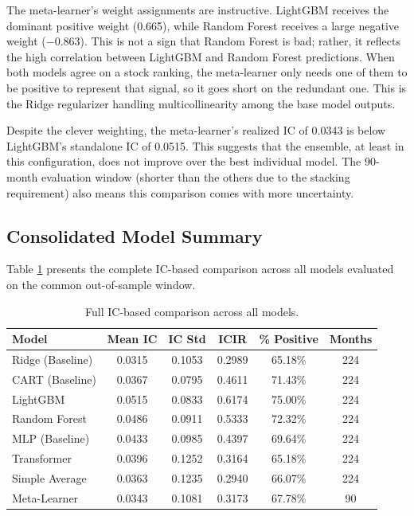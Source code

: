 \documentclass[11pt]{article}
\begin{document}
The meta-learner's weight assignments are instructive. LightGBM receives the dominant positive weight (0.665), while Random Forest receives a large negative weight ($-$0.863). This is not a sign that Random Forest is bad; rather, it reflects the high correlation between LightGBM and Random Forest predictions. When both models agree on a stock ranking, the meta-learner only needs one of them to be positive to represent that signal, so it goes short on the redundant one. This is the Ridge regularizer handling multicollinearity among the base model outputs.

Despite the clever weighting, the meta-learner's realized IC of 0.0343 is below LightGBM's standalone IC of 0.0515. This suggests that the ensemble, at least in this configuration, does not improve over the best individual model. The 90-month evaluation window (shorter than the others due to the stacking requirement) also means this comparison comes with more uncertainty.

\subsection{Consolidated Model Summary}

Table \ref{tab:full_summary} presents the complete IC-based comparison across all models evaluated on the common out-of-sample window.

\begin{table}[H]
\centering
\begin{tabular}{lccccc}
\toprule
\textbf{Model} & \textbf{Mean IC} & \textbf{IC Std} & \textbf{ICIR} & \textbf{\% Positive} & \textbf{Months} \\
\midrule
Ridge (Baseline)    & 0.0315 & 0.1053 & 0.2989 & 65.18\% & 224 \\
CART (Baseline)     & 0.0367 & 0.0795 & 0.4611 & 71.43\% & 224 \\
LightGBM            & 0.0515 & 0.0833 & 0.6174 & 75.00\% & 224 \\
Random Forest       & 0.0486 & 0.0911 & 0.5333 & 72.32\% & 224 \\
MLP (Baseline)      & 0.0433 & 0.0985 & 0.4397 & 69.64\% & 224 \\
Transformer         & 0.0396 & 0.1252 & 0.3164 & 65.18\% & 224 \\
Simple Average      & 0.0363 & 0.1235 & 0.2940 & 66.07\% & 224 \\
Meta-Learner        & 0.0343 & 0.1081 & 0.3173 & 67.78\% & 90  \\
\bottomrule
\end{tabular}
\caption{Full IC-based comparison across all models.}
\label{tab:full_summary}
\end{table}
\end{document}
